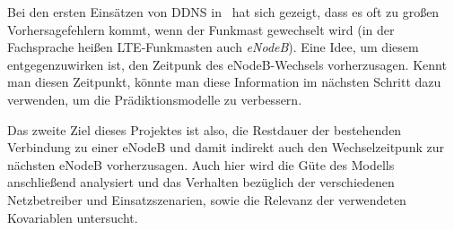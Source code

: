 Bei den ersten Eins\"atzen von DDNS in~\cite{IEEE} hat sich gezeigt, dass es oft zu gro{\ss}en Vorhersagefehlern kommt, wenn der
Funkmast gewechselt wird (in der Fachsprache hei{\ss}en LTE-Funkmasten auch \textit{eNodeB}).
Eine Idee, um diesem entgegenzuwirken ist, den Zeitpunk des eNodeB-Wechsels vorherzusagen. Kennt man diesen Zeitpunkt, k\"onnte man
diese Information im n\"achsten Schritt dazu verwenden, um die Pr\"adiktionsmodelle zu verbessern.

Das zweite Ziel dieses Projektes ist also, die Restdauer der bestehenden Verbindung zu einer eNodeB und damit indirekt auch den
Wechselzeitpunk zur n\"achsten eNodeB vorherzusagen.
Auch hier wird die G\"ute des Modells anschlie{\ss}end analysiert und das Verhalten bez\"uglich
der verschiedenen Netzbetreiber und Einsatzszenarien, sowie die Relevanz der verwendeten Kovariablen untersucht.
